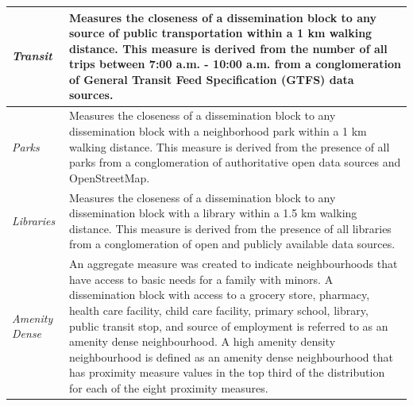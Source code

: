 \documentclass[11pt, a4paper]{article}
\begin{document}
\begin{table}[H]
{\begin{tabularx}{\textwidth}{|p{2cm}|X|}
\hline 
\textit{Transit} & Measures the closeness of a dissemination block to any source of public transportation within a 1 km walking distance. This measure is derived from the number of all trips between 7:00 a.m. - 10:00 a.m. from a conglomeration of General Transit Feed Specification (GTFS) data sources. \\ 
\hline 
\textit{Parks} & Measures the closeness of a dissemination block to any dissemination block with a neighborhood park within a 1 km walking distance. This measure is derived from the presence of all parks from a conglomeration of authoritative open data sources and OpenStreetMap. \\ 
\hline 
\textit{Libraries} & Measures the closeness of a dissemination block to any dissemination block with a library within a 1.5 km walking distance. This measure is derived from the presence of all libraries from a conglomeration of open and publicly available data sources. \\ 
\hline 
\textit{Amenity Dense} & An aggregate measure was created to indicate neighbourhoods that have access to basic needs for a family with minors. A dissemination block with access to a grocery store, pharmacy, health care facility, child care facility, primary school, library, public transit stop, and source of employment is referred to as an amenity dense neighbourhood. A high amenity density neighbourhood is defined as an amenity dense neighbourhood that has proximity measure values in the top third of the distribution for each of the eight proximity measures. \\ 
\hline 
\hline
\end{tabularx}
}
\end{table}
\end{document}
